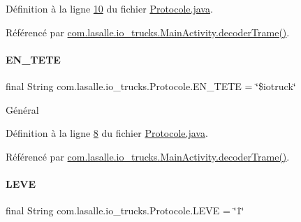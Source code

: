 Définition à la ligne \hyperlink{_protocole_8java_source_l00010}{10} du fichier \hyperlink{_protocole_8java_source}{Protocole.\+java}.



Référencé par \hyperlink{_main_activity_8java_source_l00325}{com.\+lasalle.\+io\+\_\+trucks.\+Main\+Activity.\+decoder\+Trame()}.

\mbox{\label{classcom_1_1lasalle_1_1io__trucks_1_1_protocole_abcbb6acc50e8fad665dcd3024f0b863e}} 
\paragraph{\texorpdfstring{E\+N\+\_\+\+T\+E\+TE}{EN\_TETE}}
{\footnotesize\ttfamily final String com.\+lasalle.\+io\+\_\+trucks.\+Protocole.\+E\+N\+\_\+\+T\+E\+TE = \char`\"{}\$iotruck\char`\"{}\hspace{0.3cm}{\ttfamily [static]}}

Général 

Définition à la ligne \hyperlink{_protocole_8java_source_l00008}{8} du fichier \hyperlink{_protocole_8java_source}{Protocole.\+java}.



Référencé par \hyperlink{_main_activity_8java_source_l00325}{com.\+lasalle.\+io\+\_\+trucks.\+Main\+Activity.\+decoder\+Trame()}.

\mbox{\label{classcom_1_1lasalle_1_1io__trucks_1_1_protocole_aca580f756cf43aa0010a016f56ff5c5d}} 
\paragraph{\texorpdfstring{L\+E\+VE}{LEVE}}
{\footnotesize\ttfamily final String com.\+lasalle.\+io\+\_\+trucks.\+Protocole.\+L\+E\+VE = \char`\"{}1\char`\"{}\hspace{0.3cm}{\ttfamily [static]}}



